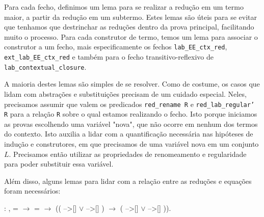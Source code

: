 

Para cada fecho, definimos um lema para se realizar a redução em um termo maior,
a partir da redução em um subtermo. Estes lemas são úteis para se evitar que
tenhamos que destrinchar as reduções dentro da prova principal, facilitando
muito o processo.  Para cada construtor de termo, temos um lema para associar o
construtor a um fecho, mais especificamente os fechos
\texttt{lab\_EE\_ctx\_red}, \texttt{ext\_lab\_EE\_ctx\_red} e também para o
fecho transitivo-reflexivo de \texttt{lab\_contextual\_closure}. 

A maioria destes lemas são simples de se resolver. Como de costume, os casos que
lidam com abstrações e substituições precisam de um cuidado especial. Neles,
precisamos assumir que valem os predicados \texttt{red\_rename R} e
\texttt{red\_lab\_regular' R} para a relação \texttt{R} sobre o qual estamos
realizando o fecho. Isto porque iniciamos as provas escolhendo uma variável
"nova", que não ocorre em nenhum dos termos do contexto. Isto auxilia a
lidar com a quantificação necessária nas hipóteses de indução e construtores, em
que precisamos de uma variável nova em um conjunto $L$. Precisamos então
utilizar as propriedades de renomeamento e regularidade para poder substituir
essa variável.

Além disso, alguns lemas para lidar com a relação entre as reduções e equações
foram necessários:

\bigskip
{} : \coqdockw{\ensuremath{\forall}}
   , 
=  \ensuremath{\rightarrow} 
=  \ensuremath{\rightarrow} ((
-->[]  \ensuremath{\lor} 
-->[] ) \ensuremath{\rightarrow} (
-->[]  \ensuremath{\lor} 
-->[] )).\coqdoceol

